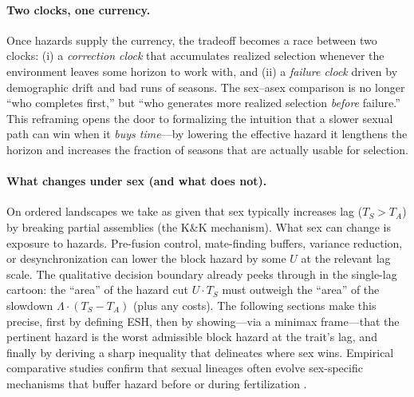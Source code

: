 \documentclass[11pt]{article}
\theoremstyle{upright}
\begin{document}
\paragraph{Two clocks, one currency.}
Once hazards supply the currency, the tradeoff becomes a race between two clocks: (i) a \emph{correction clock} that accumulates realized selection whenever the environment leaves some horizon to work with, and (ii) a \emph{failure clock} driven by demographic drift and bad runs of seasons. The sex–asex comparison is no longer “who completes first,” but “who generates more realized selection \emph{before} failure.” This reframing opens the door to formalizing the intuition that a slower sexual path can win when it \emph{buys time}—by lowering the effective hazard it lengthens the horizon and increases the fraction of seasons that are actually usable for selection. 

\paragraph{What changes under sex (and what does not).}
On ordered landscapes we take as given that sex typically increases lag ($T_S>T_A$) by breaking partial assemblies (the K\&K mechanism). What sex can change is exposure to hazards. Pre-fusion control, mate-finding buffers, variance reduction, or desynchronization can lower the block hazard by some $U$ at the relevant lag scale. The qualitative decision boundary already peeks through in the single-lag cartoon: the “area” of the hazard cut $U\cdot T_S$ must outweigh the “area” of the slowdown $\Lambda\cdot(T_S-T_A)$ (plus any costs). The following sections make this precise, first by defining ESH, then by showing—via a minimax frame—that the pertinent hazard is the worst admissible block hazard at the trait’s lag, and finally by deriving a sharp inequality that delineates where sex wins. Empirical comparative studies confirm that sexual lineages often evolve sex-specific mechanisms 
that buffer hazard before or during fertilization \citep{Promislow1992, Maklakov2013}.
\end{document}
